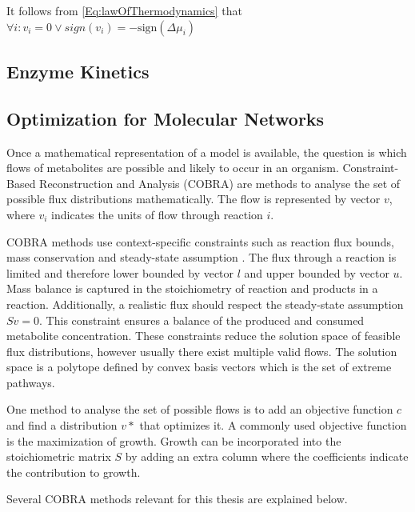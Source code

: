 
It follows from \cref{Eq:lawOfThermodynamics} that $\forall i : v_i = 0 \lor sign(v_i) = - \text{sign}(\Delta \mu_i)$ \cite{noor_removing_2018}

\subsection{Enzyme Kinetics}

\subsection{Optimization for Molecular Networks}
Once a mathematical representation of a model is available, the question is which flows of metabolites are possible and likely to occur in an organism. Constraint-Based Reconstruction and Analysis (COBRA) are methods to analyse the set of possible flux distributions mathematically. The flow is represented by vector $v$, where $v_i$ indicates the units of flow through reaction $i$. 

COBRA methods use context-specific constraints such as reaction flux bounds, mass conservation and steady-state assumption \cite{cobrapy}. The flux through a reaction is limited and therefore lower bounded by vector $l$ and upper bounded by vector $u$.  Mass balance is captured in the stoichiometry of reaction and products in a reaction. Additionally, a realistic flux should respect the steady-state assumption $Sv=0$. This constraint ensures a balance of the produced and consumed metabolite concentration.   
These constraints reduce the solution space of feasible flux distributions, however usually there exist multiple valid flows. The solution space is a polytope defined by convex basis vectors which is the set of extreme pathways. 

One method to analyse the set of possible flows is to add an objective function $c$ and find a distribution $v*$ that optimizes it. A commonly used objective function is the maximization of growth. Growth can be incorporated into the stoichiometric matrix $S$ by adding an extra column where the coefficients indicate the contribution to growth.  \cite{FBA}

Several COBRA methods relevant for this thesis are explained below.


